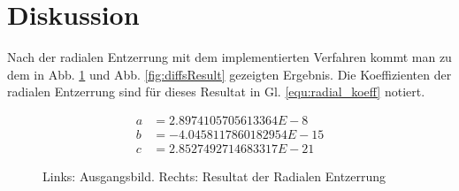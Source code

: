 
\section{Diskussion}
\label{sec:Auswertung}

Nach der radialen Entzerrung mit dem implementierten Verfahren kommt man zu dem in Abb. \ref{fig:Ergebnis} und Abb. \ref{fig:diffsResult} gezeigten Ergebnis. Die Koeffizienten der radialen Entzerrung sind für dieses Resultat in Gl. \ref{equ:radial_koeff} notiert. 

\begin{align}
a &=  2.8974105705613364E-8 \nonumber \\
b &= -4.0458117860182954E-15 \nonumber \\
c &=  2.8527492714683317E-21
\label{equ:radial_koeff}
\end{align}

\begin{figure}[H]
	\caption{Links: Ausgangsbild. Rechts: Resultat der Radialen Entzerrung}
	\label{fig:Ergebnis}
\end{figure}
	
